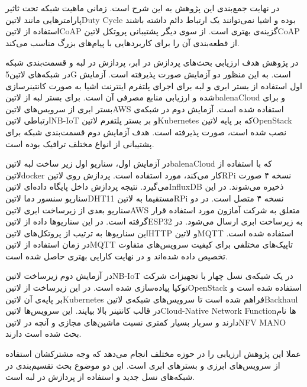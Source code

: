 در نهایت جمع‌بندی این پژوهش به این شرح است. زمانی ماهیت شبکه تحت ثاثیر پارامترهایی مانند ‌لاتین{Duty Cycle} بوده
و اشیا نمی‌توانند یک ارتباط دائم داشته باشند استفاده از ‌لاتین{CoAP} گزینه‌ی بهتری است. از سوی دیگر پشتیبانی پروتکل
‌لاتین{CoAP} از قطعه‌بندی آن را برای کاربردهایی با پیام‌های بزرگ مناسب می‌کند.



در پژوهش  هدف ارزیابی بحث‌های پردازش در ابر، پردازش در لبه و قسمت‌بندی شبکه در شبکه‌های ‌لاتین{5G} است.
به این منظور دو آزمایش صورت پذیرفته است. آزمایش اول استفاده از بستر ابری و لبه برای اجرای پلتفرم اینترنت اشیا
به صورت کانتینرسازی شده و ارزیابی منابع مصرفی آن است. برای بستر لبه از ‌لاتین{balenaCloud} و برای بستر ابری از سرویس‌های ‌لاتین{AWS}
استفاده شده است.
آزمایش دوم در شبکه‌ی ارتباطی ‌لاتین{NB-IoT} و بر بستر
پلتفرم ‌لاتین{Kubernetes} که بر پایه ‌لاتین{OpenStack} نصب شده است، صورت پذیرفته است.
هدف آزمایش دوم قسمت‌بندی شبکه برای پشتیبانی از انواع مختلف ترافیک بوده است.

در آزمایش اول، سناریو اول زیر ساخت لبه ‌لاتین{balenaCloud} که با استفاده از ‌لاتین{docker}
کار می‌کند، مورد استفاده است. پردازش روی ‌لاتین{RPi} نسخه ۴ صورت می‌گیرد. نتیجه پردازش داخل پایگاه داده‌ای
‌لاتین{InfluxDB} ذخیره می‌شوند. در این سناریو سنسور دما ‌لاتین{DHT11} مستقیما
به ‌لاتین{RPi} نسخه ۴ متصل است.
در دو سناریو بعدی از زیرساخت ابری ‌لاتین{AWS} متعلق به شرکت آمازون مورد استفاده قرار گرفته است.
در این سناریوها داده از ‌لاتین{ESP32} به زیرساخت ابری ارسال می‌شود. در این سناریوها به ترتیب
از پروتکل‌های ‌لاتین{HTTP} و ‌لاتین{MQTT} استفاده شده است.
در زمان استفاده از ‌لاتین{MQTT} تاپیک‌های مختلفی برای کیفیت سرویس‌های متفاوت تخصیص داده
شده‌اند و در نهایت کارایی بهتری حاصل شده است.

در آزمایش دوم زیرساخت ‌لاتین{NB-IoT} در یک شبکه‌ی نسل چهار با تجهیزات شرکت نوکیا پیاده‌سازی شده است.
در این زیرساخت از ‌لاتین{OpenStack} استفاده شده است و بر پایه‌ی آن ‌لاتین{Kubernetes} فراهم شده است
تا سرویس‌های شبکه‌ی ‌لاتین{Backhaul} در قالب کانتینر بالا بیایند.
این سرویس‌ها ‌لاتین{Cloud-Native Network Function}ها نام دارند و سربار بسیار کمتری نسبت ماشین‌های مجازی
و آنچه در ‌لاتین{NFV MANO} بحث شده است دارند.

عملا این پژوهش ارزیابی را در حوزه مختلف انجام می‌دهد که وجه مشترکشان استفاده از سرویس‌های ابرزی و بسترهای ابری است.
این دو موضوع بحث تقسیم‌بندی در شبکه‌های نسل جدید و استفاده از پردازش در لبه است.

